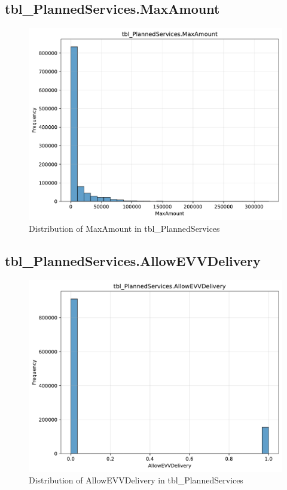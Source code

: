 \subsection{tbl\_PlannedServices.MaxAmount}

\begin{figure}[htbp]
\centering
\includegraphics[width=\textwidth]{figures/dbo_tbl_PlannedServices_MaxAmount.pdf}
\caption{Distribution of MaxAmount in tbl\_PlannedServices}
\end{figure}\newpage

\subsection{tbl\_PlannedServices.AllowEVVDelivery}

\begin{figure}[htbp]
\centering
\includegraphics[width=\textwidth]{figures/dbo_tbl_PlannedServices_AllowEVVDelivery.pdf}
\caption{Distribution of AllowEVVDelivery in tbl\_PlannedServices}
\end{figure}\newpage

